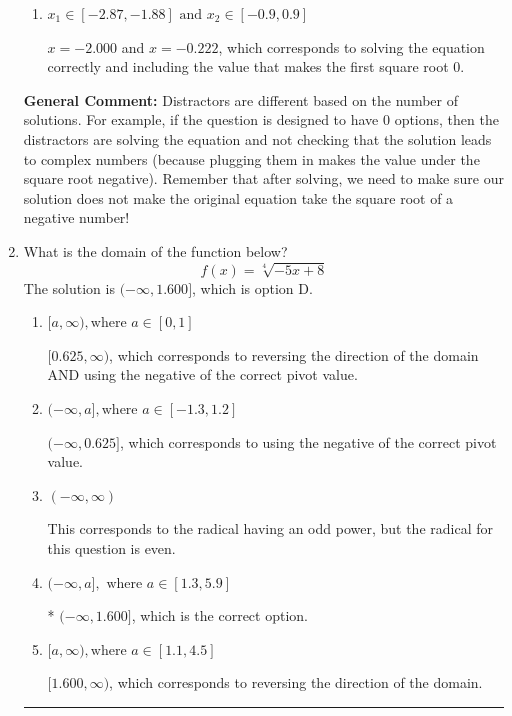 \documentclass{extbook}[14pt]
\newcommand{\litem}[1]{\item #1

\rule{\textwidth}{0.4pt}}
\begin{document}
\begin{enumerate}
{\begin{enumerate}[label=\Alph*.]
*$x = -0.222$ leads to a complex value in the equation, so this is the correct option.
\item \( x_1 \in [-2.87, -1.88] \text{ and } x_2 \in [-0.9,0.9] \)

$x = -2.000$ and $x = -0.222$, which corresponds to solving the equation correctly and including the value that makes the first square root 0.
\end{enumerate}

\textbf{General Comment:} Distractors are different based on the number of solutions. For example, if the question is designed to have 0 options, then the distractors are solving the equation and not checking that the solution leads to complex numbers (because plugging them in makes the value under the square root negative). Remember that after solving, we need to make sure our solution does not make the original equation take the square root of a negative number!
}
\litem{
What is the domain of the function below?
\[ f(x) = \sqrt[4]{-5 x + 8} \]The solution is \( (-\infty, 1.600] \), which is option D.\begin{enumerate}[label=\Alph*.]
\item \( [a, \infty), \text{where } a \in [0, 1] \)

$[0.625, \infty)$, which corresponds to reversing the direction of the domain AND using the negative of the correct pivot value.
\item \( (-\infty, a], \text{where } a \in [-1.3, 1.2] \)

$(-\infty, 0.625]$, which corresponds to using the negative of the correct pivot value.
\item \( (-\infty, \infty) \)

This corresponds to the radical having an odd power, but the radical for this question is even.
\item \( (-\infty, a], \text{ where } a \in [1.3, 5.9] \)

* $(-\infty, 1.600]$, which is the correct option.
\item \( [a, \infty), \text{where } a \in [1.1, 4.5] \)

 $[1.600, \infty)$, which corresponds to reversing the direction of the domain.
\end{enumerate}

}
\end{enumerate}
\end{document}
